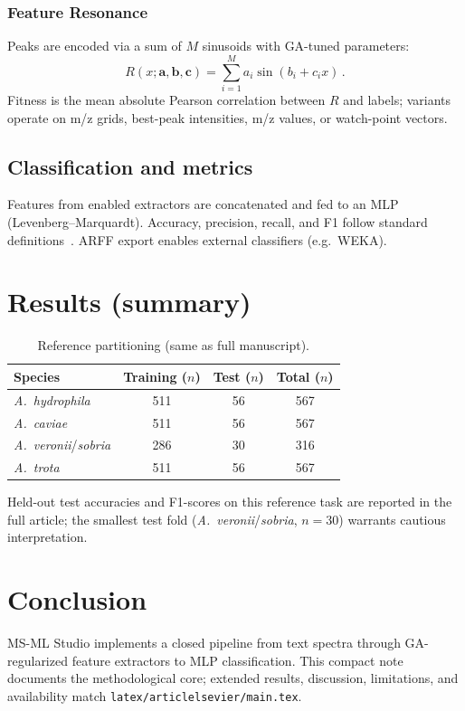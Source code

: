 \documentclass[preprint,12pt]{elsarticle}
\begin{document}
\subsubsection{Feature Resonance}
Peaks are encoded via a sum of $M$ sinusoids with GA-tuned parameters:
\begin{equation}
R(x; \mathbf{a}, \mathbf{b}, \mathbf{c}) = \sum_{i=1}^{M} a_i \sin(b_i + c_i x)\,.
\label{eq:resonance}
\end{equation}
Fitness is the mean absolute Pearson correlation between $R$ and labels; variants operate on m/z grids, best-peak intensities, m/z values, or watch-point vectors.

\subsection{Classification and metrics}
Features from enabled extractors are concatenated and fed to an MLP (Levenberg--Marquardt). Accuracy, precision, recall, and F1 follow standard definitions~\cite{Powers2011}. ARFF export enables external classifiers (e.g.\ WEKA).

\section{Results (summary)}
\label{sec:results}

\begin{table}[H]
  \centering
  \caption{Reference partitioning (same as full manuscript).}
  \label{tab:partition}
  \begin{tabular}{@{}lccc@{}}
    \toprule
    Species & Training ($n$) & Test ($n$) & Total ($n$) \\
    \midrule
    \textit{A.~hydrophila} & 511 & 56 & 567 \\
    \textit{A.~caviae} & 511 & 56 & 567 \\
    \textit{A.~veronii}/\textit{sobria} & 286 & 30 & 316 \\
    \textit{A.~trota} & 511 & 56 & 567 \\
    \bottomrule
  \end{tabular}
\end{table}

Held-out test accuracies and F1-scores on this reference task are reported in the full article; the smallest test fold (\textit{A.~veronii}/\textit{sobria}, $n=30$) warrants cautious interpretation.

\section{Conclusion}
MS-ML Studio implements a closed pipeline from text spectra through GA-regularized feature extractors to MLP classification. This compact note documents the methodological core; extended results, discussion, limitations, and availability match \texttt{latex/articlelsevier/main.tex}.
\end{document}
